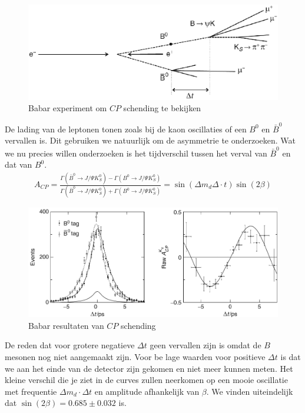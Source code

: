 \documentclass[../main.tex]{subfiles}
\begin{document}
\begin{figure}[h]
    \centering
    \includegraphics[width=0.6\linewidth]{cp_violation/babar.png}
    \caption{Babar experiment om $CP$ schending te bekijken}%
    \label{fig:cp_violation/babar}
\end{figure}

De lading van de leptonen tonen zoals bij de kaon oscillaties of een $B^0$ en $\bar{B}^0$ vervallen is. Dit gebruiken we natuurlijk om de asymmetrie te onderzoeken. Wat we nu precies willen onderzoeken is het tijdverschil tussen het verval van $\bar{B}^0$ en dat van $B^0$.
\begin{equation}
    \begin{aligned}
        \label{eq:cp_asymmetrie}
        A_{C P}=\frac{\Gamma\left(\bar{B}^{0} \rightarrow J / \Psi K_{S}^{0}\right)-\Gamma\left(B^{0} \rightarrow J / \Psi K_{S}^{0}\right)}{\Gamma\left(\bar{B}^{0} \rightarrow J / \Psi K_{S}^{0}\right)+\Gamma\left(B^{0} \rightarrow J / \Psi K_{S}^{0}\right)}=\sin \left(\Delta m_{d}\Delta \cdot t\right) \sin (2 \beta)
    \end{aligned}
\end{equation}

\begin{figure}[h]
    \centering
    \includegraphics[width=0.6\linewidth]{cp_violation/babar_results.png}
    \caption{Babar resultaten van $CP$ schending}%
    \label{fig:cp_violation/babar_results}
\end{figure}

De reden dat voor grotere negatieve $\Delta t$ geen vervallen zijn is omdat de $B$ mesonen nog niet aangemaakt zijn. Voor be lage waarden voor positieve $\Delta t$ is dat we aan het einde van de detector zijn gekomen en niet meer kunnen meten. Het kleine verschil die je ziet in de curves zullen neerkomen op een mooie oscillatie met frequentie $\Delta m_d \cdot \Delta t$ en amplitude afhankelijk van $\beta$. We vinden uiteindelijk dat $\sin (2 \beta)=0.685 \pm 0.032$ is.
\end{document}
